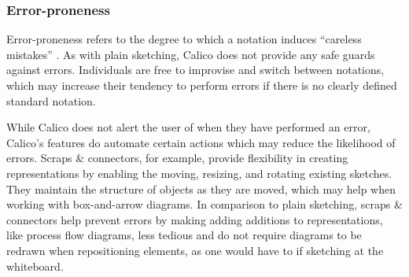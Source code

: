 \documentclass[12pt,fleqn]{ucithesis}
\begin{document}
%

\subsubsection{Error-proneness}

Error-proneness refers to the degree to which a notation induces ``careless mistakes'' \cite{Petre2013BookChapter}. As with plain sketching, Calico does not provide any safe guards against errors. Individuals are free to improvise and switch between notations, which may increase their tendency to perform errors if there is no clearly defined standard notation. 

While Calico does not alert the user of when they have performed an error, Calico's features do automate certain actions which may reduce the likelihood of errors. Scraps \& connectors, for example, provide flexibility in creating representations by enabling the moving, resizing, and rotating existing sketches. They maintain the structure of objects as they are moved, which may help when working with box-and-arrow diagrams. In comparison to plain sketching, scraps \& connectors help prevent errors by making adding additions to representations, like process flow diagrams, less tedious and do not require diagrams to be redrawn when repositioning elements, as one would have to if sketching at the whiteboard.


\end{document}
